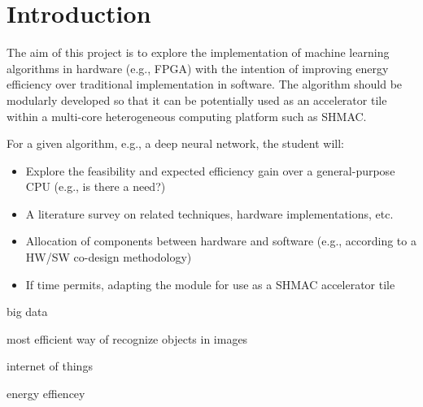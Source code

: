 \chapter{Introduction}


The aim of this project is to explore the implementation of machine learning algorithms in hardware (e.g., FPGA) with the intention of improving energy efficiency over traditional implementation in software. The algorithm should be modularly developed so that it can be potentially used as an accelerator tile within a multi-core heterogeneous computing platform such as SHMAC.

For a given algorithm, e.g., a deep neural network, the student will:

\begin{itemize}
	
	\item Explore the feasibility and expected efficiency gain over a general-purpose CPU (e.g., is there a need?)
	
	\item A literature survey on related techniques, hardware implementations, etc.
	
	\item Allocation of components between hardware and software (e.g., according to a HW/SW co-design methodology)
	
	\item If time permits, adapting the module for use as a SHMAC accelerator tile
	
\end{itemize}


big data

most efficient way of recognize objects in images

internet of things

energy effiencey